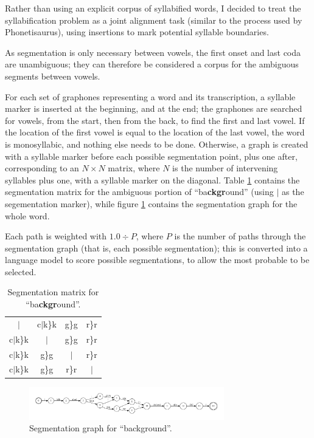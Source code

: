 \documentclass{article}[11pt]
\begin{document}
Rather than using an explicit corpus of syllabified words, I decided to treat the syllabification problem as a joint alignment task (similar to the process used by Phonetisaurus), using insertions to mark potential syllable boundaries.

As segmentation is only necessary between vowels, the first onset and last coda are unambiguous; they can therefore be considered a corpus for the ambiguous segments between vowels.

For each set of graphones representing a word and its transcription, a syllable marker is inserted at the beginning, and at the end; the graphones are searched for vowels, from the start, then from the back, to find the first and last vowel. If the location of the first vowel is equal to the location of the last vowel, the word is monosyllabic, and nothing else needs to be done. Otherwise, a graph is created with a syllable marker before each possible segmentation point, plus one after, corresponding to an $N \times N$ matrix, where $N$ is the number of intervening syllables plus one, with a syllable marker on the diagonal. Table \ref{table:matrix} contains the segmentation matrix for the ambiguous portion of ``ba\textbf{ckgr}ound'' (using $|$ as the segementation marker), while figure \ref{fig:fsa} contains the segmentation graph for the whole word.

Each path is weighted with $1.0 \div P$, where $P$ is the number of paths through the segmentation graph (that is, each possible segmentation); this is converted into a language model to score possible segmentations, to allow the most probable to be selected.

\begin{center}
\begin{table}
\centering
\begin{tabular}{ c c c c }
$|$ & c$|$k\}k & g\}g & r\}r \\
c$|$k\}k & $|$ & g\}g & r\}r \\
c$|$k\}k & g\}g & $|$ & r\}r \\
c$|$k\}k & g\}g & r\}r & $|$
\end{tabular}
\caption{Segmentation matrix for ``ba\textbf{ckgr}ound''.}
\label{table:matrix}
\end{table}
\end{center}

\begin{figure}[!h]
\caption{Segmentation graph for ``background''.}
\label{fig:fsa}
\includegraphics[width=320px]{fsa.pdf}
\end{figure}
\end{document}
